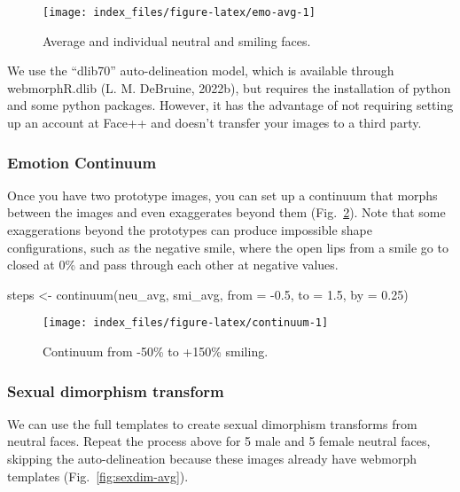 \documentclass[
  doc,floatsintext]{apa6}
\newenvironment{Shaded}{\begin{snugshade}}{\end{snugshade}}
\newcommand{\AttributeTok}[1]{\textcolor[rgb]{0.77,0.63,0.00}{#1}}
\newcommand{\FloatTok}[1]{\textcolor[rgb]{0.00,0.00,0.81}{#1}}
\newcommand{\FunctionTok}[1]{\textcolor[rgb]{0.00,0.00,0.00}{#1}}
\newcommand{\NormalTok}[1]{#1}
\newcommand{\OtherTok}[1]{\textcolor[rgb]{0.56,0.35,0.01}{#1}}
\newcommand{\SpecialCharTok}[1]{\textcolor[rgb]{0.00,0.00,0.00}{#1}}
\begin{document}
\begin{figure}
\texttt{[image: index\_files/figure-latex/emo-avg-1]} \caption{Average and individual neutral and smiling faces.}\label{fig:emo-avg}
\end{figure}

We use the ``dlib70'' auto-delineation model, which is available through webmorphR.dlib (L. M. DeBruine, 2022b), but requires the installation of python and some python packages. However, it has the advantage of not requiring setting up an account at Face++ and doesn't transfer your images to a third party.

\hypertarget{emotion-continuum}{%
\subsubsection{Emotion Continuum}\label{emotion-continuum}}

Once you have two prototype images, you can set up a continuum that morphs between the images and even exaggerates beyond them (Fig.~\ref{fig:continuum}). Note that some exaggerations beyond the prototypes can produce impossible shape configurations, such as the negative smile, where the open lips from a smile go to closed at 0\% and pass through each other at negative values.

\begin{Shaded}
\begin{Highlighting}[]
\NormalTok{steps }\OtherTok{\textless{}{-}} \FunctionTok{continuum}\NormalTok{(neu\_avg, smi\_avg, }\AttributeTok{from =} \SpecialCharTok{{-}}\FloatTok{0.5}\NormalTok{, }\AttributeTok{to =} \FloatTok{1.5}\NormalTok{, }\AttributeTok{by =} \FloatTok{0.25}\NormalTok{)}
\end{Highlighting}
\end{Shaded}



\begin{figure}
\texttt{[image: index\_files/figure-latex/continuum-1]} \caption{Continuum from -50\% to +150\% smiling.}\label{fig:continuum}
\end{figure}

\hypertarget{sexual-dimorphism-transform}{%
\subsubsection{Sexual dimorphism transform}\label{sexual-dimorphism-transform}}

We can use the full templates to create sexual dimorphism transforms from neutral faces. Repeat the process above for 5 male and 5 female neutral faces, skipping the auto-delineation because these images already have webmorph templates (Fig.~\ref{fig:sexdim-avg}).
\end{document}
